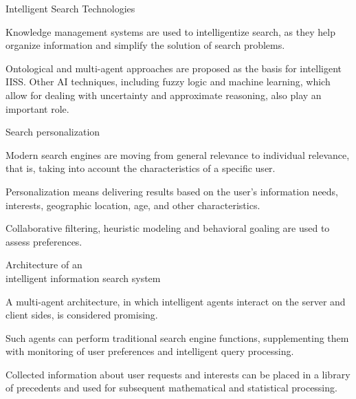 \begin{frame}{Intelligent Search Technologies}
	\topline
	\justifying
	
	\begin{textitemize}
		\item Knowledge management systems are used to intelligentize search, as they help organize information and simplify the solution of search problems.
		\item Ontological and multi-agent approaches are proposed as the basis for intelligent IISS.
		Other AI techniques, including fuzzy logic and machine learning, which allow for dealing with uncertainty and approximate reasoning, also play an important role.
	\end{textitemize}
\end{frame}

\begin{frame}{Search personalization}
	\topline
	\justifying
	
	\begin{textitemize}
		\item Modern search engines are moving from general relevance to individual relevance, that is, taking into account the characteristics of a specific user.
		\item Personalization means delivering results based on the user's information needs, interests, geographic location, age, and other characteristics.
		\item Collaborative filtering, heuristic modeling and behavioral goaling are used to assess preferences.
	\end{textitemize}
\end{frame}

\begin{frame}{Architecture of an \\intelligent information search system}
	\topline
	\justifying
	
	\begin{textitemize}
		\item A multi-agent architecture, in which intelligent agents interact on the server and client sides, is considered promising.
		\item Such agents can perform traditional search engine functions, supplementing them with monitoring of user preferences and intelligent query processing.
		\item Collected information about user requests and interests can be placed in a library of precedents and used for subsequent mathematical and statistical processing.
	\end{textitemize}
\end{frame}

